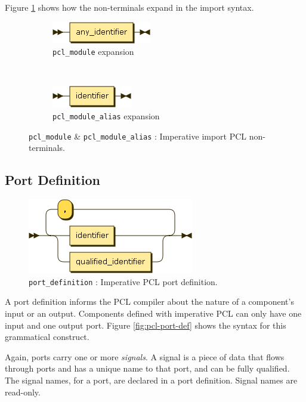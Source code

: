 Figure \ref{fig:imperative-pcl-import-non-terminals} shows how the non-terminals expand in the import syntax.
\begin{figure}[h!]
  \centering
  \begin{subfigure}[b]{0.4\textwidth}
    \includegraphics[scale=\DiagramScale]{chapters/adapter/diagrams/pcl_module}
    \caption{\texttt{pcl\_module} expansion}
  \end{subfigure}
  ~
  \begin{subfigure}[b]{0.4\textwidth}
    \includegraphics[scale=\DiagramScale]{chapters/adapter/diagrams/pcl_module_alias}
    \caption{\texttt{pcl\_module\_alias} expansion}
  \end{subfigure}
  \caption{\texttt{pcl\_module} \& \texttt{pcl\_module\_alias} : Imperative import PCL non-terminals.}
  \label{fig:imperative-pcl-import-non-terminals}
\end{figure}

\subsection{Port Definition}
\begin{figure}[h!]
  \centering
    \includegraphics[scale=\DiagramScale]{chapters/adapter/diagrams/port_definition}
  \caption{\texttt{port\_definition} : Imperative PCL port definition.}
  \label{fig:imperative-pcl-port-def}
\end{figure}
A port definition informs the PCL compiler about the nature of a component's input or an output. Components defined with imperative PCL can only have one input and one output port. Figure \ref{fig:pcl-port-def} shows the syntax for this grammatical construct.

Again, ports carry one or more \emph{signals}. A signal is a piece of data that flows through ports and has a unique name to that port, and can be fully qualified. The signal names, for a port, are declared in a port definition. Signal names are read-only.


